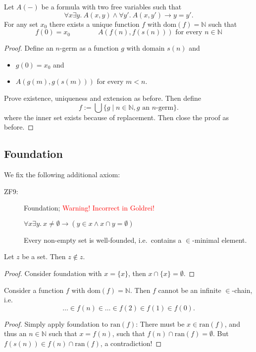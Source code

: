 \documentclass{whrartcl}
\newcommand{\NN}{\mathbb{N}}
\newcommand{\dom}{\text{dom}}
\newcommand{\ran}{\text{ran}}
\begin{document}
\begin{theorem}
  Let $A(-)$ be a formula with two free variables such that
  \[
    \forall x \exists y.~A(x, y) \wedge \forall y'.~A(x, y') \to y = y'.
  \]
  For any set $x_0$ there exists a unique function $f$ with $\dom(f) = \NN$ such that
  \[
    f(0) = x_0 \qquad\qquad A(f(n), f(s(n))) \text{ for every } n \in \NN
  \]
\end{theorem}
\begin{proof}
  Define an $n$-germ as a function $g$ with domain $s(n)$ and
  \begin{itemize}
  \item $g(0) = x_0$ and
  \item $A(g(m), g(s(m)))$ for every $m < n$.
  \end{itemize}
  Prove existence, uniqueness and extension as before. Then define
  \[
    f := \bigcup \{g \mid n \in \NN, g \text{ an } n\text{-germ}\}.
  \]
  where the inner set exists because of replacement. Then close the proof as
  before.
\end{proof}

\subsection{Foundation}

\begin{definition}
  We fix the following additional axiom:
  \begin{description}
  \item[ZF9:] Foundation; \textcolor{red}{Warning! Incorrect in Goldrei!}

    $\forall x \exists y.~x \neq \emptyset \to (y \in x \wedge x \cap y = \emptyset)$

    Every non-empty set is well-founded, i.e.\ contains a $\in$-minimal element.
  \end{description}
\end{definition}

\begin{proposition}
  Let $z$ be a set. Then $z \not\in z$.
\end{proposition}
\begin{proof}
  Consider foundation with $x = \{x\}$, then $x \cap \{x\} = \emptyset$.
\end{proof}

\begin{theorem}
  Consider a function $f$ with $\dom(f) = \NN$. Then $f$ cannot be an infinite
  $\in$-chain, i.e.
  \[\ldots \in f(n) \in \ldots \in f(2) \in f(1) \in f(0).\]
\end{theorem}
\begin{proof}
  Simply apply foundation to $\ran(f)$: There must be $x \in \ran(f)$, and thus an
  $n \in \NN$ such that $x = f(n)$, such that $f(n) \cap \ran(f) = \emptyset$.
  But $f(s(n)) \in f(n) \cap \ran(f)$, a contradiction!
\end{proof}
\end{document}
